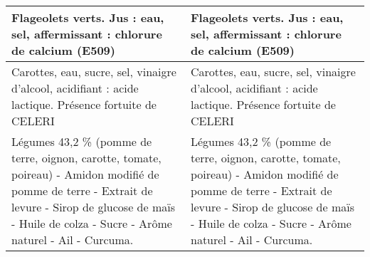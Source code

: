 \begin{tabular}{p{7cm}p{7cm}}
                                                                                                                                                                                                                                                                                 Flageolets verts. Jus : eau, sel, affermissant : chlorure de calcium (E509) &                                                                                                                                                                                                                                                                                       Flageolets verts. Jus : eau, sel, affermissant : chlorure de calcium (E509)  \\ \hline
                                                                                                                                                                                                                                                      Carottes, eau, sucre, sel, vinaigre d'alcool, acidifiant : acide lactique. Présence fortuite de CELERI &                                                                                                                                                                                                                                                             Carottes, eau, sucre, sel, vinaigre d’alcool, acidifiant : acide lactique. Présence fortuite de CELERI \\ \hline
                                                                                                                                               Légumes 43,2 \% (pomme de terre, oignon, carotte, tomate, poireau) - Amidon modifié de pomme de terre - Extrait de levure - Sirop de glucose de maïs - Huile de colza - Sucre - Arôme naturel - Ail - Curcuma. &                                                                                                                                                    Légumes 43,2 \% (pomme de terre, oignon, carotte, tomate, poireau) - Amidon modifié de pomme de terre - Extrait de levure - Sirop de glucose de maïs -  \newline Huile de colza - Sucre - Arôme naturel - Ail - Curcuma. \\ \hline
\bottomrule
\end{tabular}
